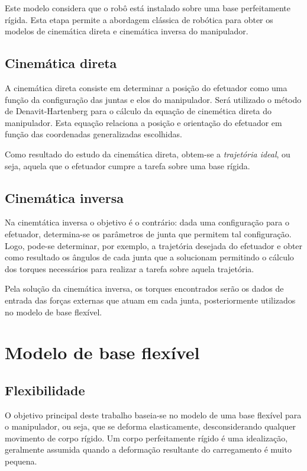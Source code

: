 Este modelo considera que o robô está instalado sobre uma base perfeitamente
rígida. Esta etapa permite a abordagem clássica de robótica para obter os
modelos de cinemática direta e cinemática inversa do manipulador.

\subsection{Cinemática direta}

A cinemática direta consiste em determinar a posição do efetuador como uma
função da configuração das juntas e elos do manipulador. Será utilizado o método
de Denavit-Hartenberg para o cálculo da equação de cinemética direta do
manipulador. Esta equação relaciona a posição e orientação do efetuador
em função das coordenadas generalizadas escolhidas.

Como resultado do estudo da cinemática direta, obtem-se a \textit{trajetória
ideal}, ou seja, aquela que o efetuador cumpre a tarefa sobre uma base
rígida.

\subsection{Cinemática inversa}

Na cinemtática inversa o objetivo é o contrário: dada uma configuração para
o efetuador, determina-se os parâmetros de junta que permitem tal configuração.
Logo, pode-se determinar, por exemplo, a trajetória desejada do efetuador e
obter como resultado os ângulos de cada junta que a solucionam permitindo o
cálculo dos torques necessários para realizar a tarefa sobre aquela trajetória.

Pela solução da cinemática inversa, os torques encontrados serão os dados de entrada
das forças externas que atuam em cada junta, posteriormente utilizados no modelo
de base flexível.

\section{Modelo de base flexível}

\subsection{Flexibilidade}
O objetivo principal deste trabalho baseia-se no modelo de uma base flexível
para o manipulador, ou seja, que se deforma elasticamente, desconsiderando
qualquer movimento de corpo rígido. Um corpo perfeitamente rígido é uma
idealização, geralmente assumida quando a deformação resultante do carregamento
é muito pequena. 

